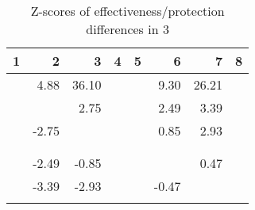 \begin{table}[ht]
\centering
\begin{tabular}{rrrrrrrr}
  \hline
1 & 2 & 3 & 4 & 5 & 6 & 7 & 8 \\ 
  \hline
 & 4.88 & 36.10 &  &  & 9.30 & 26.21 &  \\ 
   &  & 2.75 &  &  & 2.49 & 3.39 &  \\ 
   & -2.75 &  &  &  & 0.85 & 2.93 &  \\ 
   &  &  &  &  &  &  &  \\ 
   &  &  &  &  &  &  &  \\ 
   & -2.49 & -0.85 &  &  &  & 0.47 &  \\ 
   & -3.39 & -2.93 &  &  & -0.47 &  &  \\ 
   &  &  &  &  &  &  &  \\ 
   \hline
\end{tabular}
\caption{Z-scores of effectiveness/protection differences in  3} 
\end{table}
